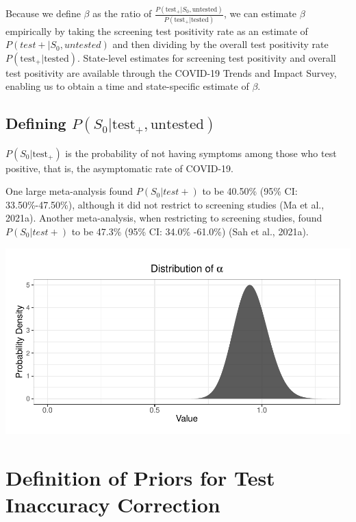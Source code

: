 \documentclass[12pt,twoside]{smiththesis}
\begin{document}
Because we define \(\beta\) as the ratio of \(\frac{P(\text{test}_+ |S_0, \text{untested})}{P(\text{test}_+|\text{tested})}\), we can estimate \(\beta\) empirically by taking the screening test positivity rate as an estimate of \(P(test + |S_0, untested)\) and then dividing by the overall test positivity rate \(P(\text{test}_+|\text{tested})\). State-level estimates for screening test positivity and overall test positivity are available through the COVID-19 Trends and Impact Survey, enabling us to obtain a time and state-specific estimate of \(\beta\).

\hypertarget{defining-ps_0texttest_textuntested}{%
\subsection{\texorpdfstring{Defining \(P(S_0|\text{test}_+,\text{untested})\)}{Defining P(S\_0\textbar\textbackslash text\{test\}\_+,\textbackslash text\{untested\})}}\label{defining-ps_0texttest_textuntested}}

\(P(S_0|\text{test}_+)\) is the probability of not having symptoms among those who test positive, that is, the asymptomatic rate of COVID-19.

One large meta-analysis found \(P(S_0|test+)\) to be 40.50\% (95\% CI: 33.50\%-47.50\%), although it did not restrict to screening studies (Ma et al., 2021a). Another meta-analysis, when restricting to screening studies, found \(P(S_0|test+)\) to be 47.3\% (95\% CI: 34.0\% -61.0\%) (Sah et al., 2021a).
\begin{center}\includegraphics[width=0.8\linewidth]{thesis_files/figure-latex/unnamed-chunk-57-1} \end{center}

\hypertarget{definition-of-priors-for-test-inaccuracy-correction}{%
\section{Definition of Priors for Test Inaccuracy Correction}\label{definition-of-priors-for-test-inaccuracy-correction}}
\end{document}
